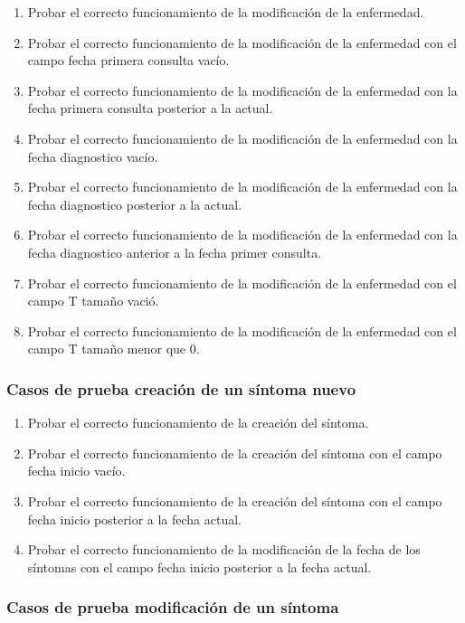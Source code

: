 \begin{enumerate}
    \item Probar el correcto funcionamiento de la modificación de la enfermedad.
    \item Probar el correcto funcionamiento de la modificación de la enfermedad con el campo fecha primera consulta vacío.
    \item Probar el correcto funcionamiento de la modificación de la enfermedad con la fecha primera consulta posterior a la actual.
    \item Probar el correcto funcionamiento de la modificación de la enfermedad con la fecha diagnostico vacío.
    \item Probar el correcto funcionamiento de la modificación de la enfermedad con la fecha diagnostico posterior a la actual.
    \item Probar el correcto funcionamiento de la modificación de la enfermedad con la fecha diagnostico anterior a la fecha primer consulta.
    \item Probar el correcto funcionamiento de la modificación de la enfermedad con el campo T tamaño vació.
    \item Probar el correcto funcionamiento de la modificación de la enfermedad con el campo T tamaño menor que 0.
\end{enumerate}

\subsubsection{Casos de prueba creación de un síntoma nuevo}

\begin{enumerate}
    \item Probar el correcto funcionamiento de la creación del síntoma.
    \item Probar el correcto funcionamiento de la creación del síntoma con el campo fecha inicio vacío.
    \item Probar el correcto funcionamiento de la creación del síntoma con el campo fecha inicio posterior a la fecha actual.
    \item Probar el correcto funcionamiento de la modificación de la fecha de los síntomas con el campo fecha inicio posterior a la fecha actual.
\end{enumerate}

\subsubsection{Casos de prueba modificación de un síntoma}

